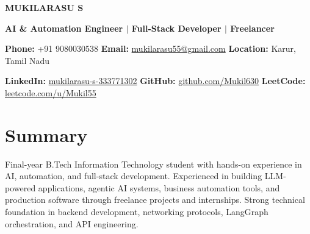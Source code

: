 \documentclass[10pt,a4paper]{article}
\begin{document}
\color{darktext}

\begin{center}

    {\LARGE\bfseries MUKILARASU S}

    \vspace{3pt}

    {\normalsize\color{accent}\textbf{
    AI \& Automation Engineer
    \enspace$\vert$\enspace
    Full-Stack Developer
    \enspace$\vert$\enspace
    Freelancer
    }}

    \vspace{5pt}

    {\small\color{graytext}
    \textbf{Phone:} +91 9080030538
    \quad
    \textbf{Email:} \href{mailto:mukilarasu55@gmail.com}{mukilarasu55@gmail.com}
    \quad
    \textbf{Location:} Karur, Tamil Nadu
    }

    \vspace{3pt}

    {\small\color{graytext}
    \textbf{LinkedIn:} \href{https://linkedin.com/in/mukilarasu-s-333771302}{mukilarasu-s-333771302}
    \quad
    \textbf{GitHub:} \href{https://github.com/Mukil630}{github.com/Mukil630}
    \quad
    \textbf{LeetCode:} \href{https://leetcode.com/u/Mukil55}{leetcode.com/u/Mukil55}
    }

\end{center}

\vspace{-4pt}

\section{Summary}

{\small\color{graytext}
Final-year B.Tech Information Technology student with hands-on experience in AI, automation, and full-stack development. Experienced in building LLM-powered applications, agentic AI systems, business automation tools, and production software through freelance projects and internships. Strong technical foundation in backend development, networking protocols, LangGraph orchestration, and API engineering.
}

\end{document}
